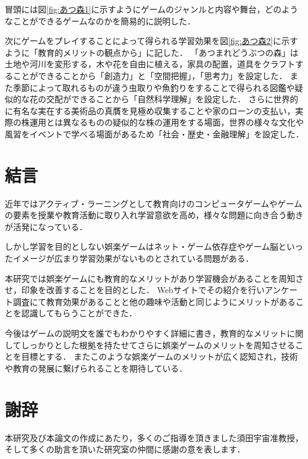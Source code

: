 \documentclass[12pt,a4j,titlepage]{ltjsarticle}
\begin{document}
冒頭には図\ref{fig:あつ森1}に示すようにゲームのジャンルと内容や舞台，どのようなことができるゲームなのかを簡易的に説明した．

次にゲームをプレイすることによって得られる学習効果を図\ref{fig:あつ森2}に示すように「教育的メリットの観点から」に記した．
「あつまれどうぶつの森」は土地や河川を変形する，木や花を自由に植える，家具の配置，道具をクラフトすることができることから「創造力」と「空間把握」，「思考力」を設定した．
また季節によって取れるものが違う虫取りや魚釣りをすることで得られる図鑑や疑似的な花の交配ができることから「自然科学理解」を設定した．
さらに世界的に有名な実在する美術品の真贋を見極め収集することや家のローンの支払い，実際の株運用とは異なるものの疑似的な株の運用をする場面，世界の様々な文化や風習をイベントで学べる場面があるため「社会・歴史・金融理解」を設定した．

\clearpage
\section{結言}
近年ではアクティブ・ラーニングとして教育向けのコンピュータゲームやゲームの要素を授業や教育活動に取り入れ学習意欲を高め，様々な問題に向き合う動きが活発になっている．

しかし学習を目的としない娯楽ゲームはネット・ゲーム依存症やゲーム脳といったイメージが広まり学習効果がないものとされている問題がある．

本研究では娯楽ゲームにも教育的なメリットがあり学習機会があることを周知させ，印象を改善することを目的とした．
Webサイトでその紹介を行いアンケート調査にて教育効果があることと他の趣味や活動と同じようにメリットがあることを認識してもらうことができた．

今後はゲームの説明文を誰でもわかりやすく詳細に書き，教育的なメリットに関してしっかりとした根拠を持たせてさらに娯楽ゲームのメリットを周知させることを目標とする．
またこのような娯楽ゲームのメリットが広く認知され，技術や教育の発展に繋げられることを期待している．

\clearpage
\section{謝辞}
本研究及び本論文の作成にあたり，多くのご指導を頂きました須田宇宙准教授，そして多くの助言を頂いた研究室の仲間に感謝の意を表します．
\end{document}
